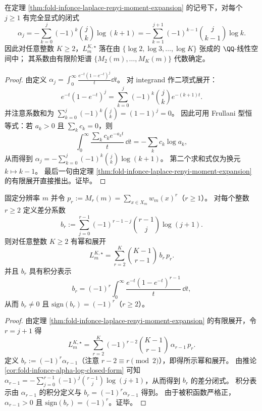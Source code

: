 \begin{corollary}\label{cor:fold-infonce-alpha-log-closed-form}
在定理 \ref{thm:fold-infonce-laplace-renyi-moment-expansion} 的记号下，对每个 \(j\ge 1\) 有完全显式的闭式
\[
\alpha_j
=
-\sum_{k=0}^{j}(-1)^k\binom{j}{k}\log(k+1)
=
-\sum_{k=1}^{j+1}(-1)^{k-1}\binom{j}{k-1}\log k.
\]
因此对任意整数 \(K\ge 2\)，\(L_m^{K,\star}\) 落在由 \(\{\log 2,\log 3,\dots,\log K\}\) 张成的 \(\QQ\)-线性空间中；
其系数由有限阶矩谱 \(\{M_2(m),\dots,M_K(m)\}\) 代数确定。
\end{corollary}
\begin{proof}
由定义
\(
\alpha_j=\int_{0}^{\infty}\frac{e^{-t}(1-e^{-t})^j}{t}\dd t
\)。
对 integrand 作二项式展开：
\[
e^{-t}(1-e^{-t})^j=\sum_{k=0}^{j}(-1)^k\binom{j}{k}e^{-(k+1)t}.
\]
并注意系数和为 \(\sum_{k=0}^{j}(-1)^k\binom{j}{k}=(1-1)^j=0\)。
因此可用 Frullani 型恒等式：若 \(a_k>0\) 且 \(\sum_k c_k=0\)，则
\[
\int_{0}^{\infty}\frac{\sum_k c_k e^{-a_k t}}{t}\,\dd t=-\sum_k c_k\log a_k,
\]
从而得到
\(
\alpha_j=-\sum_{k=0}^{j}(-1)^k\binom{j}{k}\log(k+1)
\)。
第二个求和式仅为换元 \(k\mapsto k-1\)。
最后一句由定理 \ref{thm:fold-infonce-laplace-renyi-moment-expansion} 的有限展开直接推出。证毕。
\end{proof}

\begin{proposition}\label{prop:fold-infonce-bayes-infonce-power-sum-expansion}
固定分辨率 \(m\) 并令 \(p_r:=M_r(m)=\sum_{x\in X_m}w_m(x)^r\)（\(r\ge 1\)）。
对每个整数 \(r\ge 2\) 定义差分系数
\[
b_r:=\sum_{j=0}^{r-1}(-1)^{r-1-j}\binom{r-1}{j}\log(j+1).
\]
则对任意整数 \(K\ge 2\) 有幂和展开
\[
L_m^{K,\star}=\sum_{r=2}^{K}\binom{K-1}{r-1}\,b_r\,p_r.
\]
并且 \(b_r\) 具有积分表示
\[
b_r=(-1)^r\int_{0}^{\infty}\frac{e^{-t}(1-e^{-t})^{r-1}}{t}\,\dd t,
\]
从而 \(b_r\neq 0\) 且 \(\mathrm{sign}(b_r)=(-1)^r\)（\(r\ge 2\)）。
\end{proposition}
\begin{proof}
由定理 \ref{thm:fold-infonce-laplace-renyi-moment-expansion} 的有限展开，令 \(r=j+1\) 得
\[
L_m^{K,\star}
=\sum_{r=2}^{K}(-1)^{r-2}\binom{K-1}{r-1}\,\alpha_{r-1}\,p_r.
\]
定义 \(b_r:=(-1)^r\alpha_{r-1}\)（注意 \(r-2\equiv r\pmod 2\)），即得所示幂和展开。
由推论 \ref{cor:fold-infonce-alpha-log-closed-form} 可知
\(
\alpha_{r-1}=-\sum_{j=0}^{r-1}(-1)^j\binom{r-1}{j}\log(j+1)
\)，从而得到 \(b_r\) 的差分闭式。
积分表示由 \(\alpha_{r-1}\) 的积分定义与 \(b_r=(-1)^r\alpha_{r-1}\) 得到。
由于被积函数严格正，\(\alpha_{r-1}>0\) 且 \(\mathrm{sign}(b_r)=(-1)^r\)。证毕。
\end{proof}

